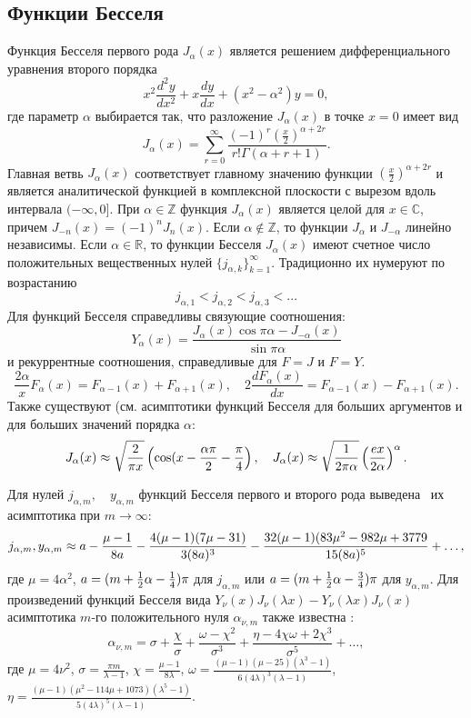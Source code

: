 \subsection{Функции Бесселя}\label{sec:ch1/sec1/sub2}
Функция Бесселя первого рода $J_\alpha(x)$ является решением дифференциального уравнения второго порядка
$$x^2\frac{d^2y}{dx^2} + x\frac{dy}{dx} + (x^2 - \alpha^2)y=0,$$
где параметр $\alpha$ выбирается так, что разложение $J_\alpha(x)$ в точке $x=0$ имеет вид
$$J_\alpha(x) = \sum_{r=0}^\infty \frac{(-1)^r (\frac{x}{2})^{\alpha + 2r}}{r! \Gamma(\alpha+r+1)}.$$
Главная ветвь $J_\alpha(x)$ соответствует главному значению функции $(\frac{x}{2})^{\alpha + 2r}$ и является аналитической функцией в комплексной плоскости с вырезом вдоль интервала $(-\infty, 0]$. 
При $\alpha \in \mathbb{Z}$ функция $J_\alpha(x)$ является целой для $x \in \mathbb{C}$, причем $J_{-n}(x) = (-1)^nJ_n(x)$. Если $\alpha \notin \mathbb{Z}$, то функции $J_\alpha$ и $J_{-\alpha}$ линейно независимы.
Если $\alpha \in \mathbb{R}$, то функции Бесселя $J_\alpha(x)$ имеют счетное число положительных вещественных нулей $\{ j_{\alpha, k} \}_{k=1}^\infty$. Традиционно их нумеруют по возрастанию 
$$j_{\alpha, 1} < j_{\alpha, 2} < j_{\alpha, 3} < ...$$
Для функций Бесселя справедливы связующие соотношения:
$$Y_\alpha(x) = \frac{J_\alpha(x) \cos \pi \alpha - J_{-\alpha}(x)}{\sin \pi \alpha}$$ и рекуррентные соотношения, справедливые для $F=J$ и $F=Y$.
$$ \frac{2\alpha}{x}F_\alpha(x) = F_{\alpha-1}(x)+F_{\alpha+1}(x), \quad 
2\frac{d F_\alpha(x)}{d x} = F_{\alpha-1}(x)-F_{\alpha+1}(x).$$ 
Также существуют (см. \cite[\S~10.19]{wref5} асимптотики функций Бесселя для больших аргументов и для больших значений порядка $\alpha$:
$$J_\alpha(x) \approx \sqrt{2 \over \pi x}\left( \cos(x - \frac{\alpha \pi}{2} - \frac{\pi}{4} \right), \quad J_\alpha(x) \approx \sqrt{1 \over 2 \pi \alpha}\left(e x  \over 2 \alpha\right)^\alpha.$$

Для нулей $j_{\alpha, m}, \quad y_{\alpha, m}$ функций Бесселя первого и второго рода выведена~\cite{wref3} их асимптотика при $m \to \infty$:
$$j_{\alpha, m}, y_{\alpha, m} \approx a - {\mu - 1 \over 8 a} - {4(\mu - 1)(7\mu - 31) \over 3(8a)^3} - {32(\mu - 1)(83\mu^2 - 982\mu + 3779 \over 15(8a)^5}+\dots,$$
где $\mu = 4 \alpha^2$, $a=(m+{1\over2}\alpha - {1\over4})\pi$ для $j_{\alpha, m}$ или $a=(m+{1\over2}\alpha - {3\over4})\pi$ для $y_{\alpha, m}$.
Для произведений функций Бесселя вида $Y_\nu(x) J_\nu(\lambda x) - Y_\nu(\lambda x) J_\nu(x)$ асимптотика $m$-го положительного нуля $\alpha_{\nu, m}$ также известна  \cite[\S\ 9, с.~358]{wref2}:
 $$\alpha_{\nu, m} = \sigma + \frac{\chi}{\sigma} + \frac{\omega-\chi^2}{\sigma^3} + \frac{\eta-4\chi \omega +2\chi^3}{\sigma^5} + \dots,$$
 где $\mu=4\nu^2$,
$\sigma=\frac{\pi m}{\lambda - 1}$,
 $\chi = \frac{\mu - 1}{8 \lambda}$,
 $\omega = \frac{(\mu-1)(\mu-25)(\lambda^3 - 1)}{6(4\lambda)^3(\lambda-1)}$,
 $\eta = \frac{(\mu-1)(\mu^2-114\mu+1073)(\lambda^5-1)}{5(4\lambda)^5(\lambda-1)}$.


